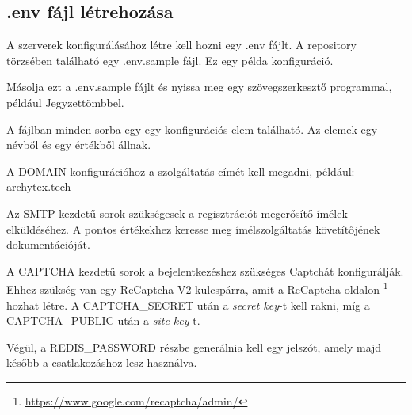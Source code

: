 \subsection{.env fájl létrehozása}

A szerverek konfigurálásához létre kell hozni egy .env fájlt. A repository törzsében található egy .env.sample fájl. Ez egy példa konfiguráció.

Másolja ezt a .env.sample fájlt és nyissa meg egy szövegszerkesztő programmal, például Jegyzettömbbel.

A fájlban minden sorba egy-egy konfigurációs elem található. Az elemek egy névből és egy értékből állnak.

A DOMAIN konfigurációhoz a szolgáltatás címét kell megadni, például: archytex.tech

Az SMTP kezdetű sorok szükségesek a regisztrációt megerősítő ímélek elküldéséhez. A pontos értékekhez keresse meg ímélszolgáltatás követítőjének dokumentációját.

A CAPTCHA kezdetű sorok a bejelentkezéshez szükséges Captchát konfigurálják. Ehhez szükség van egy ReCaptcha V2 kulcspárra, amit a ReCaptcha oldalon \footnote{\url{https://www.google.com/recaptcha/admin/}} hozhat létre. A CAPTCHA\_SECRET után a \emph{secret key}-t kell rakni, míg a CAPTCHA\_PUBLIC után a \emph{site key}-t.

Végül, a REDIS\_PASSWORD részbe generálnia kell egy jelszót, amely majd később a csatlakozáshoz lesz használva.